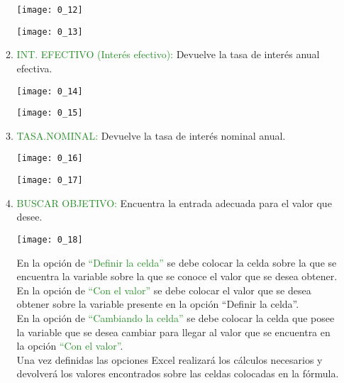 \begin{enumerate}
\begin{enumerate}
        \begin{center}
        \texttt{[image: 0\_12]} \\
        \end{center}
        \begin{center}
        \texttt{[image: 0\_13]}
        \end{center}
        \item \textcolor{ForestGreen}{INT. EFECTIVO (Interés efectivo):} Devuelve la tasa de interés anual efectiva.
        \begin{center}
        \texttt{[image: 0\_14]} \\
        \end{center}
        \begin{center}
        \texttt{[image: 0\_15]}
        \end{center}
        \item \textcolor{ForestGreen}{TASA.NOMINAL:} Devuelve la tasa de interés nominal anual. 
        \begin{center}
        \texttt{[image: 0\_16]} \\
        \end{center}
        \begin{center}
        \texttt{[image: 0\_17]}
        \end{center}
        \item \textcolor{ForestGreen}{BUSCAR OBJETIVO:} Encuentra la entrada adecuada para el valor que desee. 
        \begin{center}
        \texttt{[image: 0\_18]} \\
        \end{center}
        En la opción de \textcolor{ForestGreen}{“Definir la celda”} se debe colocar la celda sobre la que se encuentra la variable sobre la que se conoce el valor que se desea obtener. \\
        En la opción de \textcolor{ForestGreen}{“Con el valor”} se debe colocar el valor que se desea obtener sobre la variable presente en la opción “Definir la celda”. \\
        En la opción de \textcolor{ForestGreen}{“Cambiando la celda”} se debe colocar la celda que posee la variable que se desea cambiar para llegar al valor que se encuentra en la opción \textcolor{ForestGreen}{“Con el valor”}. \\
        Una vez definidas las opciones Excel realizará los cálculos necesarios y devolverá los valores encontrados sobre las celdas colocadas en la fórmula. \\ \\ 
    

\end{enumerate}
\end{enumerate}
